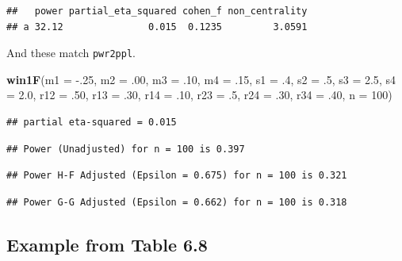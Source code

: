 \documentclass[]{book}
\newenvironment{Shaded}{\begin{snugshade}}{\end{snugshade}}
\newcommand{\DataTypeTok}[1]{\textcolor[rgb]{0.13,0.29,0.53}{#1}}
\newcommand{\DecValTok}[1]{\textcolor[rgb]{0.00,0.00,0.81}{#1}}
\newcommand{\FloatTok}[1]{\textcolor[rgb]{0.00,0.00,0.81}{#1}}
\newcommand{\KeywordTok}[1]{\textcolor[rgb]{0.13,0.29,0.53}{\textbf{#1}}}
\newcommand{\NormalTok}[1]{#1}
\begin{document}
\begin{verbatim}
##   power partial_eta_squared cohen_f non_centrality
## a 32.12               0.015  0.1235         3.0591
\end{verbatim}

And these match \texttt{pwr2ppl}.

\begin{Shaded}
\begin{Highlighting}[]
\KeywordTok{win1F}\NormalTok{(}\DataTypeTok{m1 =} \FloatTok{-.25}\NormalTok{, }\DataTypeTok{m2 =} \FloatTok{.00}\NormalTok{, }\DataTypeTok{m3 =} \FloatTok{.10}\NormalTok{, }\DataTypeTok{m4 =} \FloatTok{.15}\NormalTok{,}
      \DataTypeTok{s1 =} \FloatTok{.4}\NormalTok{, }\DataTypeTok{s2 =} \FloatTok{.5}\NormalTok{, }\DataTypeTok{s3 =} \FloatTok{2.5}\NormalTok{, }\DataTypeTok{s4 =} \FloatTok{2.0}\NormalTok{,}
      \DataTypeTok{r12 =} \FloatTok{.50}\NormalTok{, }\DataTypeTok{r13 =} \FloatTok{.30}\NormalTok{, }\DataTypeTok{r14 =} \FloatTok{.10}\NormalTok{,}
      \DataTypeTok{r23 =} \FloatTok{.5}\NormalTok{, }\DataTypeTok{r24 =} \FloatTok{.30}\NormalTok{, }\DataTypeTok{r34 =} \FloatTok{.40}\NormalTok{,}
      \DataTypeTok{n =} \DecValTok{100}\NormalTok{)}
\end{Highlighting}
\end{Shaded}

\begin{verbatim}
## partial eta-squared = 0.015
\end{verbatim}

\begin{verbatim}
## Power (Unadjusted) for n = 100 is 0.397
\end{verbatim}

\begin{verbatim}
## Power H-F Adjusted (Epsilon = 0.675) for n = 100 is 0.321
\end{verbatim}

\begin{verbatim}
## Power G-G Adjusted (Epsilon = 0.662) for n = 100 is 0.318
\end{verbatim}

\hypertarget{example-from-table-6.8}{%
\subsection{Example from Table 6.8}\label{example-from-table-6.8}}
\end{document}

